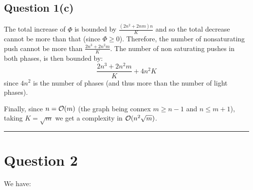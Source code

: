 \documentclass[math]{cours}
\begin{document}
\subsection{Question 1(c)}
The total increase of $\Phi$ is bounded by $\frac{(2n^{2} + 2nm)n}{K}$ and so the total decrease cannot be more than that (since $\Phi \geq 0$).
Therefore, the number of nonsaturating push cannot be more than $\frac{2n^{3} + 2n^{2}m}{K}$.
The number of non saturating pushes in both phases, is then bounded by:
\begin{equation*}
	\frac{2n^{3} + 2n^{2}m}{K} + 4n^{2}K
\end{equation*}
since $4n^{2}$ is the number of phases (and thus more than the number of light phases).

Finally, since $n = \mathcal{O}(m)$ (the graph being connex $m \geq n - 1$ and $n \leq m + 1$), taking $K = \sqrt{m}$ we get a complexity in $\mathcal{O}(n^{2}\sqrt{m})$.

\hrule

\section{Question 2}
We have:
\end{document}
